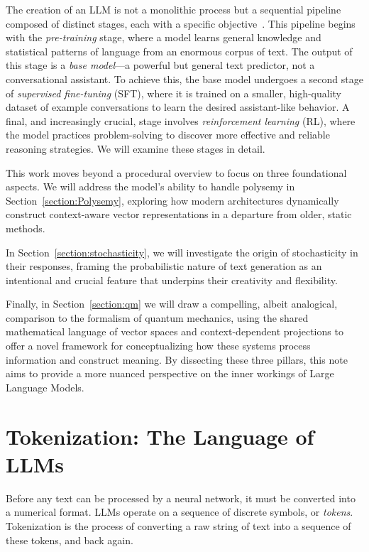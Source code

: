 \documentclass[%
  reprint,
  superscriptaddress,
  showpacs,
  showkeys,
  amsmath,amssymb,
  pra,
  longbibliography,
  floatfix,
  x11names
]{revtex4-2}
\begin{document}
The creation of an LLM is not a monolithic process but a sequential pipeline composed of distinct stages, each with a specific objective~\cite{karpathy2025intro}. This pipeline begins with the \textit{pre-training} stage, where a model learns general knowledge and statistical patterns of language from an enormous corpus of text. The output of this stage is a \textit{base model}---a powerful but general text predictor, not a conversational assistant. To achieve this, the base model undergoes a second stage of \textit{supervised fine-tuning} (SFT), where it is trained on a smaller, high-quality dataset of example conversations to learn the desired assistant-like behavior. A final, and increasingly crucial, stage involves \textit{reinforcement learning} (RL), where the model practices problem-solving to discover more effective and reliable reasoning strategies. We will examine these stages in detail.



This work moves beyond a procedural overview to focus on three foundational aspects.
We will  address the model's ability to handle polysemy in Section~\ref{section:Polysemy},
exploring how modern architectures dynamically
construct context-aware vector representations in a
departure from older, static methods.

In Section~\ref{section:stochasticity}, we will investigate the origin of stochasticity in their responses,
framing the probabilistic nature of text generation as an intentional and crucial
feature that underpins their creativity and flexibility.

Finally, in Section~\ref{section:qm} we will draw a compelling, albeit analogical, comparison to the formalism of quantum mechanics, using the shared mathematical language of vector spaces and context-dependent projections to offer a novel framework for conceptualizing how these systems process information and construct meaning. By dissecting these three pillars, this note aims to provide a more nuanced perspective on the inner workings of Large Language Models.



\section{Tokenization: The Language of LLMs}

Before any text can be processed by a neural network, it must be converted into a numerical format. LLMs operate on a sequence of discrete symbols, or \textit{tokens}. Tokenization is the process of converting a raw string of text into a sequence of these tokens, and back again.
\end{document}
